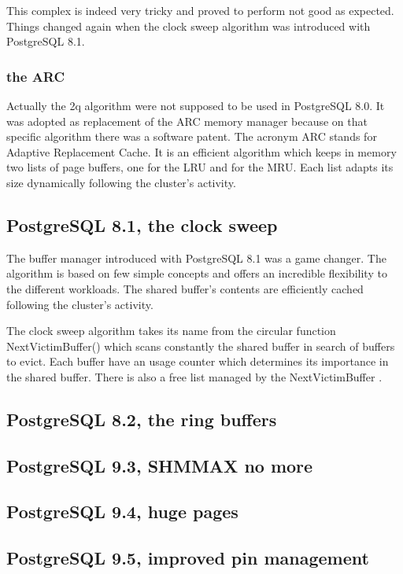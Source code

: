 This complex is indeed very tricky and proved to perform not good as expected. Things changed again when the clock sweep algorithm was introduced with PostgreSQL 8.1.


\subsubsection{the ARC}
Actually the 2q algorithm were not supposed to be used in PostgreSQL 8.0. It was adopted as replacement of the ARC memory manager because on that specific algorithm there was a software patent. 
The acronym ARC stands for Adaptive Replacement Cache. It is an efficient algorithm which keeps in memory two lists of page buffers, one for the LRU and for the MRU. 
Each list adapts its size dynamically following the cluster's activity. 

\subsection{PostgreSQL 8.1, the clock sweep}
The buffer manager introduced with PostgreSQL 8.1 was a game changer. The algorithm is based on few simple concepts and offers an incredible 
flexibility to the different workloads. The shared buffer's contents are efficiently cached following the cluster's activity.\newline

The clock sweep algorithm takes its name from the circular function NextVictimBuffer() which scans constantly the shared buffer in search of buffers to evict.
Each buffer have an usage counter which determines its importance in the shared buffer. There is also a free list managed by the NextVictimBuffer . 


\subsection{PostgreSQL 8.2, the ring buffers}

\subsection{PostgreSQL 9.3, SHMMAX no more}

\subsection{PostgreSQL 9.4, huge pages}

\subsection{PostgreSQL 9.5, improved pin management}


